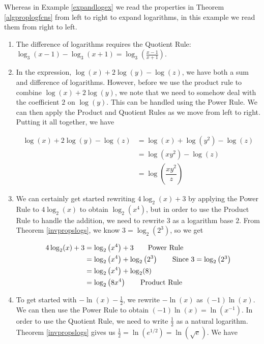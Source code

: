 {
Whereas in Example \ref{expandlogex} we read the properties in Theorem \ref{algproplogfcns} from left to right to expand logarithms, in this example we read them from right to left.

\begin{enumerate}

\item The difference of logarithms requires the Quotient Rule: $\log_{3}(x-1) - \log_{3}(x+1) = \log_{3}\left(\frac{x-1}{x+1}\right)$.

\item  In the expression, $\log(x) + 2\log(y) - \log(z)$, we have both a sum and difference of logarithms.  However, before we use the product rule to combine $\log(x) + 2\log(y)$, we note that we need to somehow deal with the coefficient $2$ on $\log(y)$.  This can be handled using the Power Rule. We can then apply the Product and Quotient Rules as we move from left to right. Putting it all together, we have

\begin{align*}
\log(x) + 2\log(y) - \log(z) & =  \log(x) + \log\left(y^2\right) - \log(z)  \tag*{Power Rule} \\
                             & =  \log\left(xy^2\right) - \log(z)  \tag*{Product Rule} \\
                             & =  \log\left( \dfrac{xy^2}{z}\right)  \tag*{Quotient Rule}
\end{align*}
                             
\item  We can certainly get started rewriting $4\log_{2}(x) + 3$ by applying the Power Rule to  $4\log_{2}(x)$ to obtain $\log_{2}\left(x^4\right)$, but in order to use the Product Rule to handle the addition, we need to rewrite $3$ as a logarithm base $2$.  From Theorem \ref{invpropslogs}, we know $3 = \log_{2}\left(2^3\right)$, so we get

\begin{align*}
4\log_{2}(x) + 3 & =  \log_{2}\left(x^4\right) + 3   \tag*{Power Rule} \\ 
  & =  \log_{2}\left(x^4\right) + \log_{2}\left(2^3\right) \tag*{Since $3 = \log_{2}\left(2^3\right)$} \\
  & =  \log_{2}\left(x^4\right) + \log_{2}(8) \\
  & =  \log_{2}\left( 8x^4\right)  \tag*{Product Rule}
\end{align*}

\item To get started with $-\ln(x) - \frac{1}{2}$, we rewrite  $-\ln(x)$ as $(-1) \ln(x)$.  We can then use the Power Rule to obtain $(-1)\ln(x) = \ln\left(x^{-1}\right)$. In order to use the Quotient Rule, we need to write $\frac{1}{2}$ as a natural logarithm. Theorem \ref{invpropslogs} gives us $\frac{1}{2} = \ln\left(e^{1/2}\right) = \ln\left(\sqrt{e}\right)$.  We have 


\end{enumerate}}
